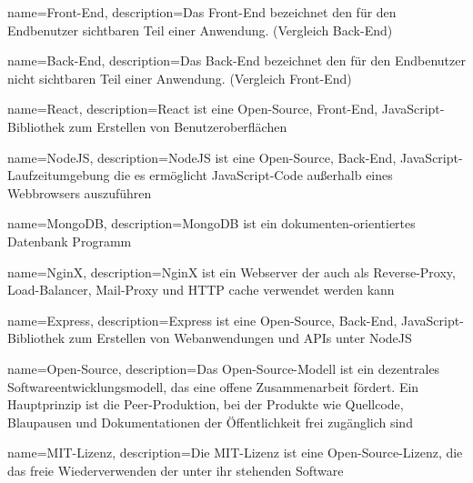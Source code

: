 {   name={Front-End},
    description={Das Front-End bezeichnet den für den Endbenutzer sichtbaren Teil einer Anwendung. (Vergleich \gls{Back-End})}
}

{   name={Back-End},
    description={Das Back-End bezeichnet den für den Endbenutzer nicht sichtbaren Teil einer Anwendung. (Vergleich \gls{Front-End})}
}

{   name={React},
    description={React ist eine Open-Source, \gls{Front-End}, JavaScript-Bibliothek zum Erstellen von Benutzeroberflächen}
}

{   name={NodeJS},
    description={NodeJS ist eine Open-Source, \gls{Back-End}, JavaScript-Laufzeitumgebung die es ermöglicht JavaScript-Code außerhalb eines Webbrowsers auszuführen}
}

{   name={MongoDB},
    description={MongoDB ist ein dokumenten-orientiertes Datenbank Programm}
}

{   name={NginX},
    description={NginX ist ein Webserver der auch als Reverse-Proxy, Load-Balancer, Mail-Proxy und HTTP cache verwendet werden kann}
}

{   name={Express},
    description={Express ist eine Open-Source, \gls{Back-End}, JavaScript-Bibliothek zum Erstellen von Webanwendungen und APIs unter \gls{NodeJS}}
}

{   name={Open-Source},
    description={Das Open-Source-Modell ist ein dezentrales Softwareentwicklungsmodell, das eine offene Zusammenarbeit fördert. Ein Hauptprinzip ist die Peer-Produktion, bei der Produkte wie Quellcode, Blaupausen und Dokumentationen der Öffentlichkeit frei zugänglich sind}
}

{   name={MIT-Lizenz},
    description={Die MIT-Lizenz ist eine \gls{Open-Source}-Lizenz, die das freie Wiederverwenden der unter ihr stehenden Software}
}
